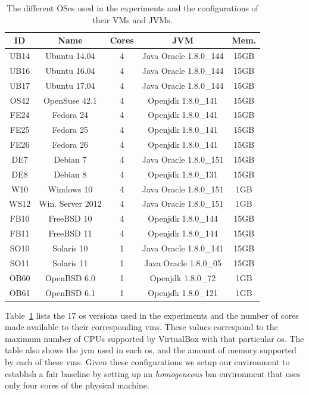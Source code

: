 \begin{table}[t]
\begin{center}
{\footnotesize
\begin{tabular}{| c | c | c | c | c |}\hline
\textbf{ID} & \textbf{Name}  & \textbf{Cores} & \textbf{JVM} & \textbf{Mem.} \\\hline\hline
UB14 & Ubuntu 14.04 & 4 & Java Oracle 1.8.0\_144 & 15GB \\ \hline
UB16 & Ubuntu 16.04 & 4 & Java Oracle 1.8.0\_144 & 15GB \\ \hline
UB17 & Ubuntu 17.04 & 4 & Java Oracle 1.8.0\_144 & 15GB \\ \hline
OS42 & OpenSuse 42.1 & 4 & Openjdk 1.8.0\_141 & 15GB \\ \hline
FE24 & Fedora 24 & 4 & Openjdk 1.8.0\_141 & 15GB \\ \hline
FE25 & Fedora 25 & 4 & Openjdk 1.8.0\_141 & 15GB \\ \hline
FE26 & Fedora 26 & 4 & Openjdk 1.8.0\_141 & 15GB \\ \hline
DE7 & Debian 7 & 4 & Java Oracle 1.8.0\_151 & 15GB \\ \hline
DE8 & Debian 8 & 4 & Openjdk 1.8.0\_131 & 15GB \\ \hline
W10 & Windows 10 & 4 & Java Oracle 1.8.0\_151 &1GB \\ \hline
WS12 & Win. Server 2012 & 4 & Java Oracle 1.8.0\_151 & 1GB \\ \hline
FB10 & FreeBSD 10 & 4 & Openjdk 1.8.0\_144 & 15GB \\ \hline
FB11 & FreeBSD 11 & 4 & Openjdk 1.8.0\_144 & 15GB \\ \hline
SO10 & Solaris 10 & 1 & Java Oracle 1.8.0\_141 & 15GB \\ \hline
SO11 & Solaris 11 & 1 & Java Oracle 1.8.0\_05 & 15GB \\ \hline
OB60 & OpenBSD 6.0 & 1 & Openjdk 1.8.0\_72 & 1GB \\ \hline
OB61 & OpenBSD 6.1 & 1 & Openjdk 1.8.0\_121 & 1GB \\ \hline
\end{tabular}
}
\vspace{2mm}
\caption{The different OSes used in the experiments and the configurations of their VMs and JVMs.}
\label{tab:oses}
\end{center}
\end{table}

Table~\ref{tab:oses} lists the 17 \gls{os} versions used in the experiments and the number of cores made available to their corresponding \glspl{vm}.
These values correspond to the maximum number of CPUs supported by VirtualBox with that particular \gls{os}.
The table also shows the \gls{jvm} used in each \gls{os}, and the amount of memory supported by each of these \glspl{vm}.
Given these configurations we setup our environment to establish a fair baseline by setting up an \emph{homogeneous} \gls{bm} environment that uses only four cores of the physical machine. 

